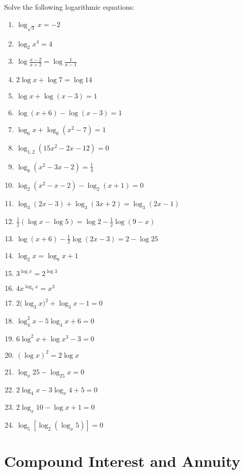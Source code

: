 \documentclass[12pt]{report}
\begin{document}
\setlength{\columnseprule}{1pt}
\setlength{\columnsep}{24pt}
\begin{multicols}{2}
  Solve the following logarithmic equations:
  \begin{enumerate}
    \item $\log_{\sqrt{3}}x=-2$
    \item $\log_{2}x^{4}=4$
    \item $\log{\frac{x-2}{x+2}}=\log{\frac{1}{x-1}}$
    \item $2\log x+\log7=\log14$
    \item $\log x+\log\left(x-3\right)=1$
    \item $\log\left(x+6\right)-\log\left(x-3\right)=1$
    \item $\log_{6}x+\log_{6}(x^{2}-7)=1$
    \item $\log_{1,2}(15x^{2}-2x-12)=0$
    \item $\log_{8}(x^{2}-3x-2)={\frac{1}{3}}$
    \item $\log_{2}(x^{2}-x-2)-\log_{2}(x+1)=0$
    \item $\log_{3}(2x-3)+\log_{3}(3x+2)=\log_{3}(2x-1)$
    \item $\frac{1}{2}(\log x-\log5)=\log2-\frac{1}{2}\log(9-x)$
    \item $\log\left(x+6\right)-{\frac{1}{2}}\log\left(2x-3\right)=2-\log25$
    \item $\log_{2}x=\log_{8}x+1$
    \item $3^{\log x}=2^{\log3}$
    \item $4x^{\log_{2}x}=x^{3}$
    \item $2\bigl(\log_{3}x\bigr)^{2}+\log_{3}x-1=0$
    \item $\log_{4}^{2}x-5\log_{4}x+6=0$
    \item $6\log^{2}x+\log x^{3}-3=0$
    \item $(\log x)^{2}=2\log x$
    \item $\log_{x}25-\log_{25}x=0$
    \item $2\log_{4}x-3\log_{x}4+5=0$
    \item $2\log_{x}10-\log x+1=0$
    \item $\log_{5}\left[\log_{2}\left(\log_{x}5\right)\right]=0$
  \end{enumerate}
\end{multicols}

\section{Compound Interest and Annuity}
\end{document}
